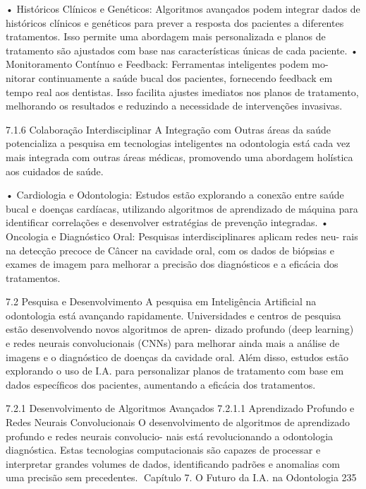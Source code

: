     • Históricos Clínicos e Genéticos: Algoritmos avançados podem integrar dados
      de históricos clínicos e genéticos para prever a resposta dos pacientes a diferentes
      tratamentos. Isso permite uma abordagem mais personalizada e planos de
      tratamento são ajustados com base nas características únicas de cada paciente.
    • Monitoramento Contínuo e Feedback: Ferramentas inteligentes podem mo-
      nitorar continuamente a saúde bucal dos pacientes, fornecendo feedback em
      tempo real aos dentistas. Isso facilita ajustes imediatos nos planos de tratamento,
      melhorando os resultados e reduzindo a necessidade de intervenções invasivas.

7.1.6     Colaboração Interdisciplinar
A Integração com Outras áreas da saúde potencializa a pesquisa em tecnologias
inteligentes na odontologia está cada vez mais integrada com outras áreas médicas,
promovendo uma abordagem holística aos cuidados de saúde.

    • Cardiologia e Odontologia: Estudos estão explorando a conexão entre saúde
      bucal e doenças cardíacas, utilizando algoritmos de aprendizado de máquina
      para identificar correlações e desenvolver estratégias de prevenção integradas.
    • Oncologia e Diagnóstico Oral: Pesquisas interdisciplinares aplicam redes neu-
      rais na detecção precoce de Câncer na cavidade oral, com os dados de biópsias
      e exames de imagem para melhorar a precisão dos diagnósticos e a eficácia dos
      tratamentos.


7.2       Pesquisa e Desenvolvimento
A pesquisa em Inteligência Artificial na odontologia está avançando rapidamente.
Universidades e centros de pesquisa estão desenvolvendo novos algoritmos de apren-
dizado profundo (deep learning) e redes neurais convolucionais (CNNs) para melhorar
ainda mais a análise de imagens e o diagnóstico de doenças da cavidade oral. Além
disso, estudos estão explorando o uso de I.A. para personalizar planos de tratamento
com base em dados específicos dos pacientes, aumentando a eficácia dos tratamentos.

7.2.1     Desenvolvimento de Algoritmos Avançados
7.2.1.1   Aprendizado Profundo e Redes Neurais Convolucionais
O desenvolvimento de algoritmos de aprendizado profundo e redes neurais convolucio-
nais está revolucionando a odontologia diagnóstica. Estas tecnologias computacionais
são capazes de processar e interpretar grandes volumes de dados, identificando
padrões e anomalias com uma precisão sem precedentes.
Capítulo 7. O Futuro da I.A. na Odontologia                                       235


